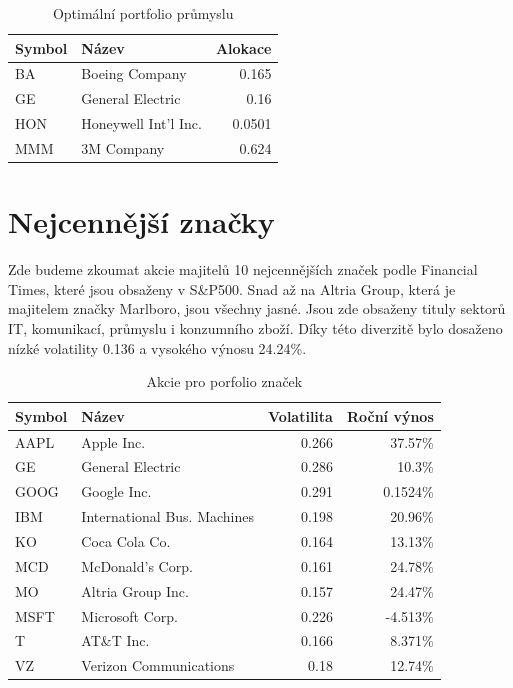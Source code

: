 \documentclass[12pt,a4paper]{report}
\begin{document}
    \begin{table}[htb]
      \centering
      \begin{tabular}{|l|l|r|}
        \hline
        Symbol&Název&Alokace\\\hline\hline
        BA&Boeing Company &0.165\\\hline
        GE&General Electric &0.16\\\hline
        HON&Honeywell Int'l Inc. &0.0501\\\hline
        MMM&3M Company &0.624\\\hline
      \end{tabular}
      \caption{Optimální portfolio průmyslu}
    \end{table}
    
  \clearpage
  \section{Nejcennější značky}
    Zde budeme zkoumat akcie majitelů 10 nejcennějších značek podle Financial Times\cite{ft}, které jsou obsaženy v S\&P500. Snad až na Altria Group, která je majitelem značky Marlboro, jsou všechny jasné. Jsou zde obsaženy tituly sektorů IT, komunikací, průmyslu i konzumního zboží. Díky této diverzitě bylo dosaženo nízké volatility 0.136 a vysokého výnosu 24.24\%.   
    \begin{table}[htb]
      \centering
      \begin{tabular}{|l|l|r|r|}
        \hline
        Symbol&Název&Volatilita&Roční výnos\\\hline\hline
        AAPL&Apple Inc. &0.266&37.57\%\\\hline
        GE&General Electric &0.286&10.3\%\\\hline
        GOOG&Google Inc. &0.291&0.1524\%\\\hline
        IBM&International Bus. Machines &0.198&20.96\%\\\hline
        KO&Coca Cola Co. &0.164&13.13\%\\\hline
        MCD&McDonald's Corp. &0.161&24.78\%\\\hline
        MO&Altria Group Inc. &0.157&24.47\%\\\hline
        MSFT&Microsoft Corp. &0.226&-4.513\%\\\hline
        T&AT\&T Inc. &0.166&8.371\%\\\hline
        VZ&Verizon Communications &0.18&12.74\%\\\hline
      \end{tabular}
      \caption{Akcie pro porfolio značek}
    \end{table}
\end{document}
